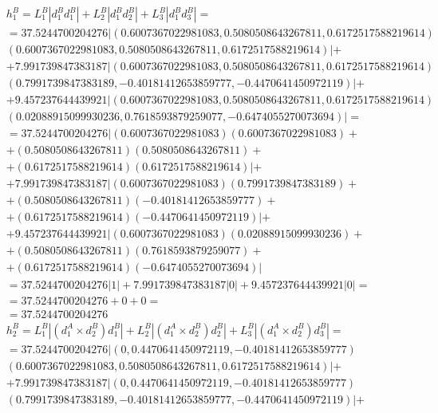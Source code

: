 \documentclass[a4paper]{article}
\begin{document}
	\begin{align*}
		&h_1^B = L_1^B|d_1^B d_1^B | + L_2^B|d_1^B d_2^B | + L_3^B|d_1^B d_3^B | = 
		\\
		&= 37.5244700204276| (0.6007367022981083, 0.5080508643267811, 0.6172517588219614)\\& (0.6007367022981083, 0.5080508643267811, 0.6172517588219614) |+
		\\
		&+ 7.991739847383187| (0.6007367022981083, 0.5080508643267811, 0.6172517588219614)\\& (0.7991739847383189, -0.40181412653859777, -0.4470641450972119) |+
		\\
		&+ 9.457237644439921| (0.6007367022981083, 0.5080508643267811, 0.6172517588219614)\\& (0.02088915099930236, 0.7618593879259077, -0.6474055270073694) |=
		\\
		&=37.5244700204276 | (0.6007367022981083)(0.6007367022981083) +\\&+ (0.5080508643267811)(0.5080508643267811) +\\&+ (0.6172517588219614)(0.6172517588219614)  |+
		\\
		& +7.991739847383187 | (0.6007367022981083)(0.7991739847383189) +\\&+ (0.5080508643267811)(-0.40181412653859777) +\\&+ (0.6172517588219614)(-0.4470641450972119)  | +
		\\
		& +9.457237644439921 | (0.6007367022981083)(0.02088915099930236) +\\&+ (0.5080508643267811)(0.7618593879259077) +\\&+ (0.6172517588219614)(-0.6474055270073694)  | 
		\\
		&= 37.5244700204276| 1 | +
		7.991739847383187| 0 |+
		9.457237644439921| 0 |=
		\\
		&=37.5244700204276 +
		0 +
		0 =
		\\
		&= 37.5244700204276
		\\
		&h_2^B = L_1^B|(d_1^A \times d_2^B) d_1^B | + L_2^B|(d_1^A \times d_2^B) d_2^B | + L_3^B|(d_1^A \times d_2^B) d_3^B | = 
		\\
		&= 37.5244700204276| (0, 0.4470641450972119, -0.40181412653859777)\\& (0.6007367022981083, 0.5080508643267811, 0.6172517588219614) |+
		\\
		&+ 7.991739847383187| (0, 0.4470641450972119, -0.40181412653859777) \\&(0.7991739847383189, -0.40181412653859777, -0.4470641450972119) |+

\end{align*}
\end{document}

